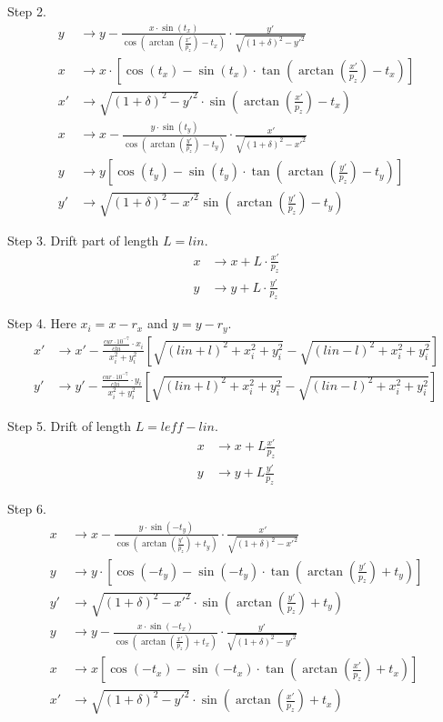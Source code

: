 Step 2.
\begin{align*}
	y &\to y - \frac{x\cdot\sin(t_x)}{
    \cos\left(\arctan\left(\frac{x'}{p_z}\right)-t_x\right)}\cdot
    \frac{y'}{\sqrt{(1+\delta)^2-y'^2}} \\
    x &\to x\cdot\left[\cos(t_x)-\sin(t_x)\cdot\tan\left(
    \arctan\left(\frac{x'}{p_z}\right)-t_x\right)\right] \\
    x' &\to \sqrt{(1+\delta)^2-y'^2}\cdot\sin\left(
    \arctan\left(\frac{x'}{p_z}\right)-t_x\right) \\
    x &\to x- \frac{y\cdot\sin(t_y)}{\cos\left(\arctan\left(\frac{y'}{p_z}\right)
    -t_y\right)} \cdot\frac{x'}{\sqrt{(1+\delta)^2-x'^2}} \\
    y &\to y \left[ \cos(t_y) - \sin(t_y)\cdot\tan\left(
    \arctan\left(\frac{y'}{p_z}\right)-t_y\right) \right] \\
    y' &\to \sqrt{(1+\delta)^2-x'^2}\sin\left(\arctan\left(
    \frac{y'}{p_z}\right)-t_y\right)
\end{align*}

Step 3. Drift part of length $L=lin$.
\begin{align*}
    x &\to x + L \cdot \frac{x'}{p_z} \\
    y &\to y + L \cdot \frac{y'}{p_z}
\end{align*}

Step 4. Here $x_i=x-r_x$ and $y=y-r_y$.
\begin{align*}
    x' &\to x' - \frac{\frac{cur\cdot10^{-7}}{chi}\cdot x_i}{x_i^2+y_i^2}
    \left[\sqrt{(lin+l)^2+x_i^2+y_i^2}-\sqrt{(lin-l)^2+x_i^2+y_i^2} \right] \\
    y' &\to y' - \frac{\frac{cur\cdot10^{-7}}{chi}\cdot y_i}{x_i^2+y_i^2}
    \left[\sqrt{(lin+l)^2+x_i^2+y_i^2}-\sqrt{(lin-l)^2+x_i^2+y_i^2} \right]
\end{align*}

Step 5. Drift of length $L=leff-lin$.
\begin{align*}
    x &\to x + L \frac{x'}{p_z} \\
    y &\to y + L \frac{y'}{p_z}
\end{align*}

Step 6.
\begin{align*}
	x &\to x - \frac{y\cdot\sin(-t_y)}{
    \cos\left(\arctan\left(\frac{y'}{p_z}\right)+t_y\right)}\cdot
    \frac{x'}{\sqrt{(1+\delta)^2-x'^2}} \\
    y &\to y\cdot\left[\cos(-t_y)-\sin(-t_y)\cdot\tan\left(
    \arctan\left(\frac{y'}{p_z}\right)+t_y\right)\right] \\
    y' &\to \sqrt{(1+\delta)^2-x'^2}\cdot\sin\left(
    \arctan\left(\frac{y'}{p_z}\right)+t_y\right) \\
    y &\to y- \frac{x\cdot\sin(-t_x)}{\cos\left(\arctan\left(\frac{x'}{p_z}\right)
    +t_x\right)} \cdot\frac{y'}{\sqrt{(1+\delta)^2-y'^2}} \\
    x &\to x \left[ \cos(-t_x) - \sin(-t_x)\cdot\tan\left(
    \arctan\left(\frac{x'}{p_z}\right)+t_x\right) \right] \\
    x' &\to \sqrt{(1+\delta)^2-y'^2}\cdot\sin\left(\arctan\left(
    \frac{x'}{p_z}\right)+t_x\right)
\end{align*}

